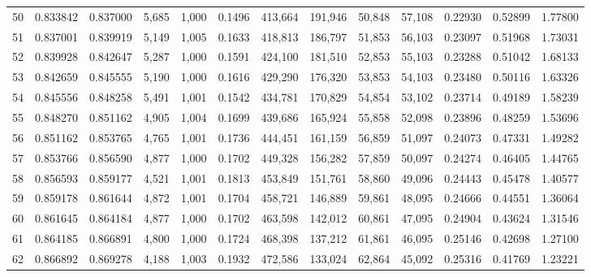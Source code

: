 \begin{tabular}{rrrrrrrrrrrrr}
50  &  0.833842 &  0.837000 &   5,685 &  1,000 &                                     0.1496 &  413,664 &  191,946 &   50,848 &   57,108 &  0.22930 &  0.52899 &  1.77800 \\
51  &  0.837001 &  0.839919 &   5,149 &  1,005 &                                     0.1633 &  418,813 &  186,797 &   51,853 &   56,103 &  0.23097 &  0.51968 &  1.73031 \\
52  &  0.839928 &  0.842647 &   5,287 &  1,000 &                                     0.1591 &  424,100 &  181,510 &   52,853 &   55,103 &  0.23288 &  0.51042 &  1.68133 \\
53  &  0.842659 &  0.845555 &   5,190 &  1,000 &                                     0.1616 &  429,290 &  176,320 &   53,853 &   54,103 &  0.23480 &  0.50116 &  1.63326 \\
54  &  0.845556 &  0.848258 &   5,491 &  1,001 &                                     0.1542 &  434,781 &  170,829 &   54,854 &   53,102 &  0.23714 &  0.49189 &  1.58239 \\
55  &  0.848270 &  0.851162 &   4,905 &  1,004 &                                     0.1699 &  439,686 &  165,924 &   55,858 &   52,098 &  0.23896 &  0.48259 &  1.53696 \\
56  &  0.851162 &  0.853765 &   4,765 &  1,001 &                                     0.1736 &  444,451 &  161,159 &   56,859 &   51,097 &  0.24073 &  0.47331 &  1.49282 \\
57  &  0.853766 &  0.856590 &   4,877 &  1,000 &                                     0.1702 &  449,328 &  156,282 &   57,859 &   50,097 &  0.24274 &  0.46405 &  1.44765 \\
58  &  0.856593 &  0.859177 &   4,521 &  1,001 &                                     0.1813 &  453,849 &  151,761 &   58,860 &   49,096 &  0.24443 &  0.45478 &  1.40577 \\
59  &  0.859178 &  0.861644 &   4,872 &  1,001 &                                     0.1704 &  458,721 &  146,889 &   59,861 &   48,095 &  0.24666 &  0.44551 &  1.36064 \\
60  &  0.861645 &  0.864184 &   4,877 &  1,000 &                                     0.1702 &  463,598 &  142,012 &   60,861 &   47,095 &  0.24904 &  0.43624 &  1.31546 \\
61  &  0.864185 &  0.866891 &   4,800 &  1,000 &                                     0.1724 &  468,398 &  137,212 &   61,861 &   46,095 &  0.25146 &  0.42698 &  1.27100 \\
62  &  0.866892 &  0.869278 &   4,188 &  1,003 &                                     0.1932 &  472,586 &  133,024 &   62,864 &   45,092 &  0.25316 &  0.41769 &  1.23221 \\

\end{tabular}
